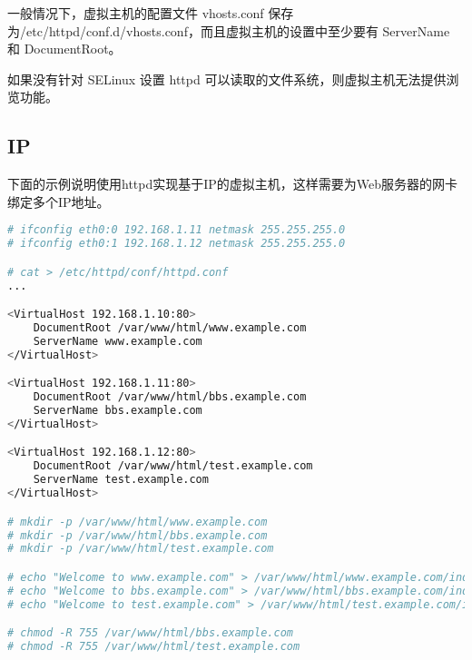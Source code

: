 一般情况下，虚拟主机的配置文件 vhosts.conf 保存为/etc/httpd/conf.d/vhosts.conf，而且虚拟主机的设置中至少要有 ServerName 和 DocumentRoot。

如果没有针对 SELinux 设置 httpd 可以读取的文件系统，则虚拟主机无法提供浏览功能。


\subsection{IP}


下面的示例说明使用httpd实现基于IP的虚拟主机，这样需要为Web服务器的网卡绑定多个IP地址。


\begin{lstlisting}[language=bash]
# ifconfig eth0:0 192.168.1.11 netmask 255.255.255.0
# ifconfig eth0:1 192.168.1.12 netmask 255.255.255.0

# cat > /etc/httpd/conf/httpd.conf
...

<VirtualHost 192.168.1.10:80>
	DocumentRoot /var/www/html/www.example.com
	ServerName www.example.com
</VirtualHost>

<VirtualHost 192.168.1.11:80>
	DocumentRoot /var/www/html/bbs.example.com
	ServerName bbs.example.com
</VirtualHost>

<VirtualHost 192.168.1.12:80>
	DocumentRoot /var/www/html/test.example.com
	ServerName test.example.com
</VirtualHost>

# mkdir -p /var/www/html/www.example.com
# mkdir -p /var/www/html/bbs.example.com
# mkdir -p /var/www/html/test.example.com

# echo "Welcome to www.example.com" > /var/www/html/www.example.com/index.html
# echo "Welcome to bbs.example.com" > /var/www/html/bbs.example.com/index.html
# echo "Welcome to test.example.com" > /var/www/html/test.example.com/index.html

# chmod -R 755 /var/www/html/bbs.example.com
# chmod -R 755 /var/www/html/test.example.com
\end{lstlisting}




\begin{lstlisting}[language=bash]

\end{lstlisting}





\begin{lstlisting}[language=bash]

\end{lstlisting}





